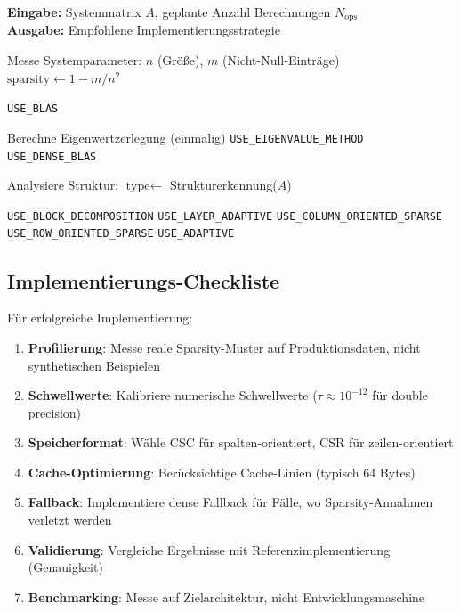 ﻿\documentclass[a4paper,12pt]{report}
\theoremstyle{definition}
\begin{document}
	\begin{algorithm}[H]
		\caption{Strategie-Auswahl für Matrix-basierte Systeme}
		\label{alg:final-decision-tree}
		\textbf{Eingabe:} Systemmatrix $A$, geplante Anzahl Berechnungen $N_{\text{ops}}$ \\
		\textbf{Ausgabe:} Empfohlene Implementierungsstrategie
		\begin{algorithmic}[1]
			\State Messe Systemparameter: $n$ (Größe), $m$ (Nicht-Null-Einträge)
			\State $\text{sparsity} \gets 1 - m/n^2$
			
			\State \Return \texttt{USE\_BLAS} 
			\EndIf
			
			\State Berechne Eigenwertzerlegung (einmalig)
			\State \Return \texttt{USE\_EIGENVALUE\_METHOD}
			\Else
			\State \Return \texttt{USE\_DENSE\_BLAS}
			\EndIf
			\EndIf
			
			\State Analysiere Struktur: $\text{type} \gets $ Strukturerkennung($A$)
			
			\State \Return \texttt{USE\_BLOCK\_DECOMPOSITION}
			\State \Return \texttt{USE\_LAYER\_ADAPTIVE}
			\State \Return \texttt{USE\_COLUMN\_ORIENTED\_SPARSE}
			\Else
			\State \Return \texttt{USE\_ROW\_ORIENTED\_SPARSE}
			\EndIf
			\Else
			\State \Return \texttt{USE\_ADAPTIVE} 
			\EndIf
		\end{algorithmic}
	\end{algorithm}
	
	\subsection{Implementierungs-Checkliste}
	
	Für erfolgreiche Implementierung:
	
	\begin{enumerate}
		\item \textbf{Profilierung}: Messe reale Sparsity-Muster auf Produktionsdaten, nicht synthetischen Beispielen
		\item \textbf{Schwellwerte}: Kalibriere numerische Schwellwerte ($\tau \approx 10^{-12}$ für double precision)
		\item \textbf{Speicherformat}: Wähle CSC für spalten-orientiert, CSR für zeilen-orientiert
		\item \textbf{Cache-Optimierung}: Berücksichtige Cache-Linien (typisch 64 Bytes)
		\item \textbf{Fallback}: Implementiere dense Fallback für Fälle, wo Sparsity-Annahmen verletzt werden
		\item \textbf{Validierung}: Vergleiche Ergebnisse mit Referenzimplementierung (Genauigkeit)
		\item \textbf{Benchmarking}: Messe auf Zielarchitektur, nicht Entwicklungsmaschine
	\end{enumerate}
	
\end{document}
